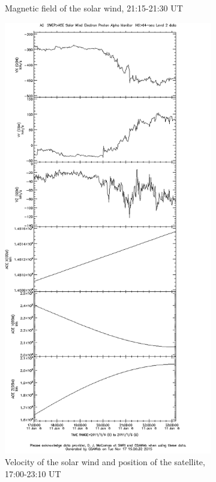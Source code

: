 \documentclass[10pt,a4paper]{article}
\begin{document}
\begin{figure}[h]
\begin{subfigure}[h]{.5\textwidth}
		\caption{Magnetic field of the solar wind, 21:15-21:30 UT}
		\label{ace2}
	\end{subfigure}
	\begin{subfigure}[h]{.5\textwidth}
		\centering
		\includegraphics[width=.8\linewidth]{ace-17-2310-v-s.png}
		\caption{Velocity of the solar wind and position of the satellite, 17:00-23:10 UT}
		\label{ace3}
	\end{subfigure}
	\begin{subfigure}[h]{.5\textwidth}
		\centering

\end{subfigure}
\end{figure}
\end{document}
